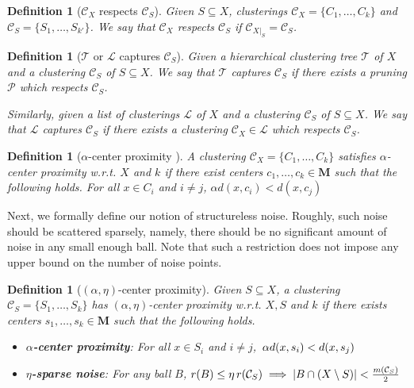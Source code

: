 \documentclass[12pt]{article}
\newtheorem{definition}[theorem]{Definition}
\newcommand{\mc}{\mathcal}
\newcommand{\mb}{\mathbf}
\begin{document}
\begin{definition}[$\mc C_{X}$ respects $\mc C_{S}$] Given $S \subseteq X$, clusterings $\mc C_{X} = \{C_1, \ldots, C_k\}$ and $\mc C_{S} = \{S_1, \ldots, S_{k'}\}$. We say that $\mc C_{X}$ respects $\mc C_{S}$ if $\mc C_{{X}|_{S}} = \mc C_{S}$.
\end{definition}

\begin{definition}[$\mc T$ or $\mc L$ captures $\mc C_{S}$]Given a hierarchical clustering tree $\mc T$ of $X$ and a clustering $\mc C_{S}$ of $S \subseteq X$.  We say that $\mc T$ captures $\mc C_{S}$ if there exists a pruning $\mc P$ which respects $\mc C_{S}$. 

Similarly, given a list of clusterings $\mc L$ of $X$ and a clustering $\mc C_{S}$ of $S \subseteq X$. We say that $\mc L$ captures $\mc C_{S}$ if there exists a clustering $\mc C_{X} \in \mc L$ which respects $\mc C_{S}$. 
\end{definition}

\begin{definition}[$\alpha$-center proximity \cite{awasthi2012center}]
\label{defn:alphacp}
A clustering $\mc C_{X} = \{C_1, \ldots, C_k\}$ satisfies $\alpha$-center proximity w.r.t. $X$ and $k$ if there exist centers $c_1, \ldots, c_k \in \mb M$  such that the following holds. For all $x \in C_i$ and $i\neq j$, $\alpha d(x, c_i) < d(x, c_j)$
\end{definition}

Next, we formally define our notion of structureless noise. Roughly, such noise should be scattered sparsely, namely, there should be no significant amount of noise in any small enough ball. Note that such a restriction does not impose any upper bound on the number of noise points.

\begin{definition}[$(\alpha, \eta)$-center proximity]
\label{def:alphaeta}
Given $S \subseteq X$, a clustering $\mc C_{S} = \{S_1, \ldots, S_k\}$ has $(\alpha, \eta)$-center proximity w.r.t. $X, S$ and $k$ if there exists centers $s_1, \ldots, s_k \in \mb M$  such that the following holds.
\begin{itemize}[nolistsep, noitemsep]
\label{defn:alphacpnoise}	

\item[$\diamond$] {\bf $\alpha$-center proximity}: For all $x \in S_i$ and $i\neq j$, $\thinspace\alpha d(x, s_i) < d(x, s_j)$
\item[$\diamond$]{\bf $\eta$-sparse noise}: For any ball $B$, $r(B)\leq \eta \thinspace r(\mc{C}_{S}) \implies |B\cap (X\setminus S)| < \frac{m(\mc C_{S})}{2}$
\end{itemize}
\end{definition}
\end{document}
